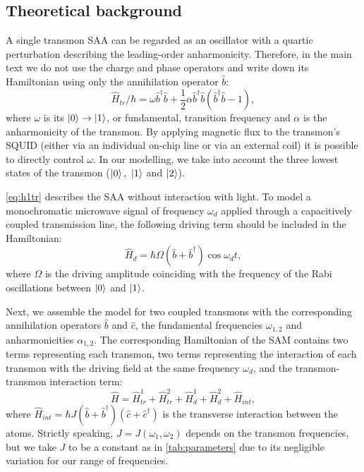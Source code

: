 \documentclass[%
 pra,
 amsmath,amssymb,
 reprint,%
]{revtex4-1}
\begin{document}
\subsection{Theoretical background}

A single transmon SAA can be regarded as an 
oscillator with a quartic perturbation describing 
the leading-order anharmonicity. Therefore, in 
the main text we do not use the charge and phase 
operators and write down its Hamiltonian using 
only the annihilation operator $\hat b$:
\begin{equation}
\hat{{H}}_{tr}/\hbar = \omega \hat 
b^{\dagger}\hat b +\frac{1}{2}\alpha \hat 
b^{\dagger}\hat b(\hat b^{\dagger}\hat b-1),
\label{eq:h1tr}
\end{equation}
where $\omega$ is its 
$\ket{0}\rightarrow\ket{1}$, or fundamental, 
transition frequency and $\alpha$ is the 
anharmonicity of the transmon. By applying 
magnetic flux to the transmon's SQUID (either via 
an individual on-chip line or via an external 
coil) it is possible\cite{koch2007charge} to 
directly  control $\omega$. In our modelling, we 
take into account the three lowest states of the 
transmon ($\ket{0},\ \ket{1}$ and $\ket{2}$).

\autoref{eq:h1tr} describes the SAA without 
interaction with light. To model a monochromatic 
microwave signal of frequency $\omega_d$ applied 
through a capacitively coupled transmission line, 
the following driving term should be included in 
the Hamiltonian:
\begin{equation}
\hat H_{d} = \hbar \Omega (\hat b+\hat b^{\dagger}) \cos\omega_d t,
\end{equation}
where $\Omega$ is the driving amplitude coinciding with the frequency of the Rabi oscillations between $\ket{0}$ and $\ket{1}$.

Next, we assemble the model for two coupled 
transmons with the corresponding annihilation 
operators $\hat b$ and $\hat c$, the fundamental 
frequencies $\omega_{1,2}$ and anharmonicities 
$\alpha_{1,2}$. The corresponding Hamiltonian of 
the SAM contains two terms representing each 
transmon, two terms representing the interaction 
of each transmon with the driving field at the 
same frequency $\omega_d$, and the 
transmon-transmon interaction term:
\begin{equation}\label{Hsystem}
\hat H = \hat H_{tr}^{1}+\hat H_{tr}^{2}+\hat H_{d}^1+\hat H_{d}^2+\hat H_{int},
\end{equation}
where $\hat H_{int} = \hbar J (\hat b +\hat 
b^\dag)(\hat c+\hat c^{\dagger})$ is the 
transverse interaction between the atoms. 
Strictly speaking, $J = J(\omega_1, \omega_2)$ 
depends on the transmon 
frequencies\cite{koch2007charge}, but we take $J$ 
to be a constant as in \autoref{tab:parameters} 
due to its negligible variation for our range of 
frequencies.  
\end{document}
